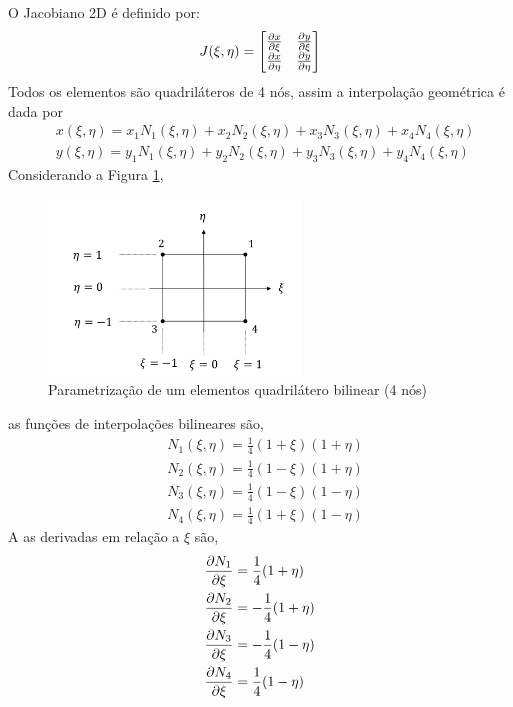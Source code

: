 O Jacobiano 2D é definido por:
%
\begin{equation}
	J(\xi, \eta) = 
	\begin{bmatrix}
		\frac{\partial x}{\partial \xi} & \frac{\partial y}{\partial \xi}\\
		\frac{\partial x}{\partial \eta} & \frac{\partial y}{\partial \eta}\\
	\end{bmatrix}
\end{equation}
%
Todos os elementos são quadriláteros de 4 nós, assim a interpolação geométrica é dada por
%
\begin{equation}
	\begin{split}
		&x(\xi, \eta) = x_1 N_1(\xi, \eta) + x_2 N_2(\xi, \eta) + x_3 N_3(\xi, \eta) + x_4 N_4(\xi, \eta)\\
		&y(\xi, \eta) = y_1 N_1(\xi, \eta) + y_2 N_2(\xi, \eta) + y_3 N_3(\xi, \eta) + y_4 N_4(\xi, \eta)
	\end{split}
\end{equation}
%
Considerando a Figura \ref{cap6:quad_bilinear}, 
%
\begin{figure}[H]
	\includegraphics[width=0.6\textwidth,center]{fig/quadrilatero_4_livro.PNG}
	\caption{Parametrização de um elementos quadrilátero bilinear (4 nós)} 
	\label{cap6:quad_bilinear}
\end{figure}
%
as funções de interpolações bilineares são,
%
\begin{equation}
	\begin{split}
		&N_1(\xi, \eta) = \frac{1}{4}(1 + \xi)(1 + \eta)\\
		&N_2(\xi, \eta) = \frac{1}{4}(1 - \xi)(1 + \eta)\\
		&N_3(\xi, \eta) = \frac{1}{4}(1 - \xi)(1 - \eta)\\
		&N_4(\xi, \eta) = \frac{1}{4}(1 + \xi)(1 - \eta)
	\end{split}
\end{equation}
%
A as derivadas em relação a $\xi$ são,
\begin{equation}
	\begin{split}
		&\frac{\partial N_1}{\partial \xi} = \frac{1}{4}(1 + \eta)\\
		&\frac{\partial N_2}{\partial \xi} =-\frac{1}{4}(1 + \eta)\\
		&\frac{\partial N_3}{\partial \xi} =-\frac{1}{4}(1 - \eta)\\
		&\frac{\partial N_4}{\partial \xi} = \frac{1}{4}(1 - \eta)\\
	\end{split}
\end{equation}
